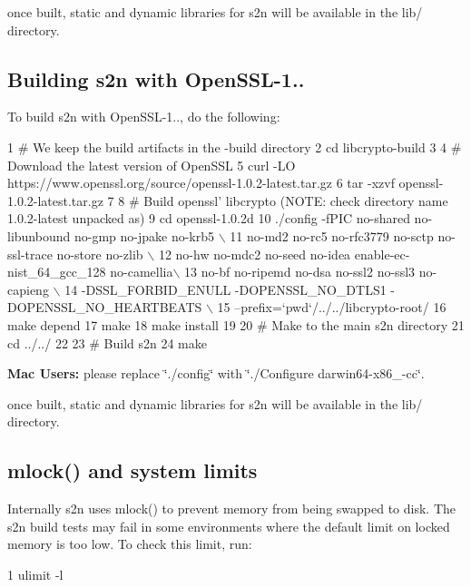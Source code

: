 once built, static and dynamic libraries for s2n will be available in the lib/ directory.

\subsection*{Building s2n with Open\+S\+S\+L-\/1..}

To build s2n with Open\+S\+S\+L-\/1.., do the following\+:


\begin{DoxyCode}
1 # We keep the build artifacts in the -build directory
2 cd libcrypto-build
3 
4 # Download the latest version of OpenSSL
5 curl -LO https://www.openssl.org/source/openssl-1.0.2-latest.tar.gz
6 tar -xzvf openssl-1.0.2-latest.tar.gz
7 
8 # Build openssl' libcrypto  (NOTE: check directory name 1.0.2-latest unpacked as)
9 cd openssl-1.0.2d
10 ./config -fPIC no-shared no-libunbound no-gmp no-jpake no-krb5              \(\backslash\)
11          no-md2 no-rc5 no-rfc3779 no-sctp no-ssl-trace no-store no-zlib     \(\backslash\)
12          no-hw no-mdc2 no-seed no-idea enable-ec-nist\_64\_gcc\_128 no-camellia\(\backslash\)
13          no-bf no-ripemd no-dsa no-ssl2 no-ssl3 no-capieng                  \(\backslash\)
14          -DSSL\_FORBID\_ENULL -DOPENSSL\_NO\_DTLS1 -DOPENSSL\_NO\_HEARTBEATS      \(\backslash\)
15          --prefix=`pwd`/../../libcrypto-root/
16 make depend
17 make
18 make install
19 
20 # Make to the main s2n directory
21 cd ../../
22 
23 # Build s2n
24 make
\end{DoxyCode}


{\bfseries Mac Users\+:} please replace \char`\"{}./config\char`\"{} with \char`\"{}./\+Configure darwin64-\/x86\+\_-\/cc\char`\"{}.

once built, static and dynamic libraries for s2n will be available in the lib/ directory.

\subsection*{mlock() and system limits}

Internally s2n uses mlock() to prevent memory from being swapped to disk. The s2n build tests may fail in some environments where the default limit on locked memory is too low. To check this limit, run\+:


\begin{DoxyCode}
1 ulimit -l
\end{DoxyCode}


